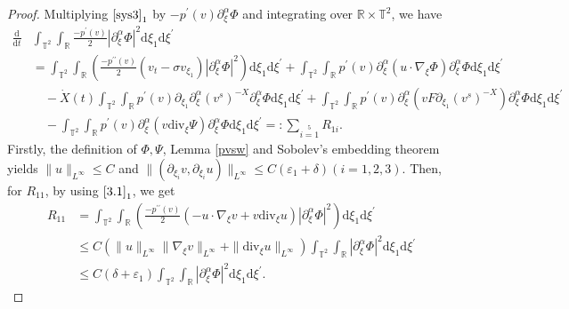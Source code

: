 \documentclass[10pt,reqno]{amsart}
\numberwithin{equation}{section}
\newcommand{\dif}{\mathrm{d}}
\newcommand{\ddiv}{\mathrm{div}}
\begin{document}
\begin{proof}
Multiplying $\eqref{sys3}_1$ by $-p^\prime(v)\partial_\xi^\alpha\Phi$ and integrating over $\mathbb{R}\times\mathbb{T}^2$, we have
\begin{align*}
\frac{\dif}{\dif t}&\int_{\mathbb{T}^2}\int_{\mathbb{R}}
\frac{-p^\prime(v)}{2}|\partial_\xi^\alpha\Phi|^2\dif \xi_1\dif \xi^{\prime}\\
&=\int_{\mathbb{T}^2}\int_{\mathbb{R}}\left(\frac{-p^{\prime\prime}(v)}{2}(v_t-\sigma v_{\xi_1})|\partial_\xi^\alpha\Phi|^2
\right)\dif \xi_1\dif \xi^{\prime}
+\int_{\mathbb{T}^2}\int_{\mathbb{R}}p^\prime(v)\partial_\xi^\alpha\left(u\cdot\nabla_\xi\Phi\right)\partial_\xi^\alpha\Phi\dif \xi_1\dif \xi^{\prime}\\
&\quad-\dot{X}(t)\int_{\mathbb{T}^2}\int_{\mathbb{R}}p^\prime(v)\partial_{\xi_1}\partial_\xi^\alpha(v^s)^{-X}\partial_\xi^\alpha\Phi\dif \xi_1\dif \xi^{\prime}
+\int_{\mathbb{T}^2}\int_{\mathbb{R}}p^\prime(v)\partial_\xi^\alpha\left(vF\partial_{\xi_1}(v^s)^{-X}\right)\partial_\xi^\alpha\Phi\dif \xi_1\dif \xi^{\prime}\\
&\quad-\int_{\mathbb{T}^2}\int_{\mathbb{R}}p^\prime(v)\partial_\xi^\alpha\left(v\ddiv_\xi\Psi\right)\partial_\xi^\alpha\Phi\dif \xi_1\dif \xi^{\prime}
=:\sum\limits_{i=1}\limits^5R_{1i}.
\end{align*}
Firstly, the definition of $\Phi, \Psi$,  Lemma \ref{pvsw} and Sobolev's embedding theorem yields $\|u\|_{L^\infty} \le C$ and $\|(\partial_{\xi_i}v, \partial_{\xi_i}u)\|_{L^\infty} \le C(\varepsilon_1+\delta)(i=1,2,3)$. Then,
for $R_{11}$, by using $\eqref{3.1}_1$, we get%
\begin{equation}\label{r11}
\begin{aligned}
R_{11}&=\int_{\mathbb{T}^2}\int_{\mathbb{R}}
\left(\frac{-p^{\prime\prime}(v)}{2}(-u\cdot\nabla_\xi v+v\ddiv_\xi u)|\partial_\xi^\alpha\Phi|^2\right)
\dif \xi_1\dif \xi^{\prime}\\
&\le C(\|u\|_{L^\infty} \|\nabla_{\xi}v\|_{L^\infty} +\|\ddiv_{\xi}u\|_{L^\infty} )\int_{\mathbb{T}^2}\int_{\mathbb{R}}|\partial_\xi^\alpha\Phi|^2\dif \xi_1\dif \xi^{\prime}\\
&\le C(\delta+\varepsilon_1)\int_{\mathbb{T}^2}\int_{\mathbb{R}}|\partial_\xi^\alpha\Phi|^2\dif \xi_1\dif \xi^{\prime}.
\end{aligned}
\end{equation}


\end{proof}
\end{document}
